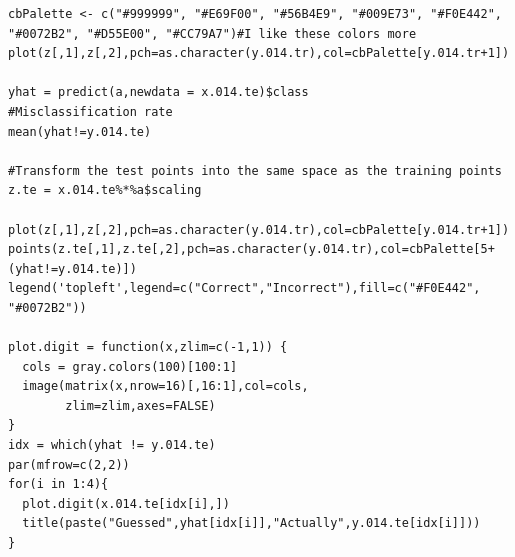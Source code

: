 \documentclass[10pt]{article}
\newcommand{\1}{\mathbbm{1}}
\begin{document}
\begin{enumerate}
{\begin{verbatim}
cbPalette <- c("#999999", "#E69F00", "#56B4E9", "#009E73", "#F0E442", "#0072B2", "#D55E00", "#CC79A7")#I like these colors more
plot(z[,1],z[,2],pch=as.character(y.014.tr),col=cbPalette[y.014.tr+1])

yhat = predict(a,newdata = x.014.te)$class
#Misclassification rate
mean(yhat!=y.014.te)

#Transform the test points into the same space as the training points
z.te = x.014.te%*%a$scaling

plot(z[,1],z[,2],pch=as.character(y.014.tr),col=cbPalette[y.014.tr+1])
points(z.te[,1],z.te[,2],pch=as.character(y.014.tr),col=cbPalette[5+(yhat!=y.014.te)])
legend('topleft',legend=c("Correct","Incorrect"),fill=c("#F0E442", "#0072B2"))

plot.digit = function(x,zlim=c(-1,1)) {
  cols = gray.colors(100)[100:1]
  image(matrix(x,nrow=16)[,16:1],col=cols,
        zlim=zlim,axes=FALSE)  
}
idx = which(yhat != y.014.te)
par(mfrow=c(2,2))
for(i in 1:4){
  plot.digit(x.014.te[idx[i],])
  title(paste("Guessed",yhat[idx[i]],"Actually",y.014.te[idx[i]]))
}
\end{verbatim}
}
\end{enumerate}
\end{document}
